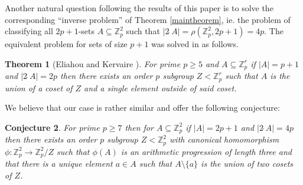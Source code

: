 \documentclass[a4paper, 12pt]{article}\usepackage[english]{babel}
\newtheorem{thm}{Theorem}[section]
\newtheorem{conj}[thm]{Conjecture}
\newcommand{\Z}{\mathbb{Z}}
\newcommand{\<}{\langle}
\begin{document}
Another natural question following the results of this paper is to solve the corresponding ``inverse problem'' of Theorem \ref{maintheorem}, ie. the problem of classifying all $2p+1$-sets $A\subseteq\Z_p^2$ such that $|2\hat{\;}A|=\rho(\Z_p^2,2p+1)=4p$. The equivalent problem for sets of size $p+1$ was solved in \cite{EliKer} as follows.
\begin{thm}[Eliahou and Kervaire \cite{EliKer}]
    For prime $p\geq 5$ and $A\subseteq \Z_p^r$ if $|A|=p+1$ and $|2\hat{\;}A|=2p$ then there exists an order $p$ subgroup $Z< \Z_p^r$ such that $A$ is the union of a coset of $Z$ and a single element outside of said coset.
\end{thm}
We believe that our case is rather similar and offer the following conjecture:
\begin{conj}
    For prime $p\geq 7$ then for $A\subseteq \Z_p^2$ if $|A|=2p+1$ and $|2\hat{\;}A|=4p$ then there exists an order $p$ subgroup $Z<\Z_p^2$ with canonical homomorphism $\phi: \Z_p^2\to \Z_p^2/Z$ such that $\phi(A)$ is an arithmetic progression of length three and that there is a unique element $a\in A$ such that $A\setminus \{a\}$ is the union of two cosets of $Z$.  
\end{conj}





\end{document}
